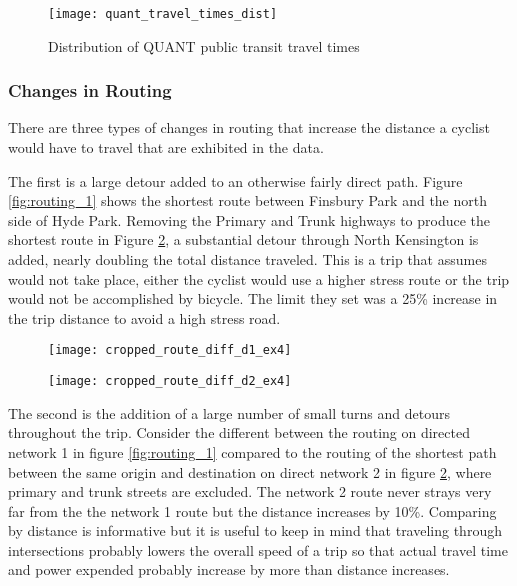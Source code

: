 \begin{figure}
\centering
\texttt{[image: quant\_travel\_times\_dist]}
\caption{Distribution of QUANT public transit travel times}
\label{fig:quant_distrib}
\end{figure}


\subsubsection{Changes in Routing} 

There are three types of changes in routing that increase the distance a cyclist would have to travel that are exhibited in the data. 

The first is a large detour added to an otherwise fairly direct path. Figure \ref{fig:routing_1} shows the shortest route between Finsbury Park and the north side of Hyde Park. Removing the Primary and Trunk highways to produce the shortest route in Figure \ref{fig:routing_2}, a substantial detour through North Kensington is added, nearly doubling the total distance traveled. This is a trip that \cite{furth2016network} assumes would not take place, either the cyclist would use a higher stress route or the trip would not be accomplished by bicycle. The limit they set was a 25\% increase in the trip distance to avoid a high stress road. 

\begin{figure}
\centering
\begin{minipage}{.5\textwidth}
  \centering
  \texttt{[image: cropped\_route\_diff\_d1\_ex4]}
  \label{fig:routing_1}
\end{minipage}%
\begin{minipage}{.5\textwidth}
  \centering
  \texttt{[image: cropped\_route\_diff\_d2\_ex4]}
  \label{fig:routing_2}
\end{minipage}
\end{figure}

The second is the addition of a large number of small turns and detours throughout the trip. Consider the different between the routing on directed network 1 in figure \ref{fig:routing_1} compared to the routing of the shortest path between the same origin and destination on direct network 2 in figure \ref{fig:routing_2}, where primary and trunk streets are excluded. The network 2 route never strays very far from the the network 1 route but the distance increases by 10\%. Comparing by distance is informative but it is useful to keep in mind that traveling through intersections probably lowers the overall speed of a trip so that actual travel time and power expended probably increase by more than distance increases. 

